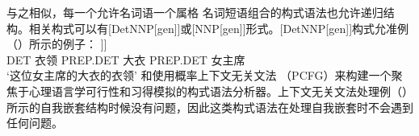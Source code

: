 与之相似，每一个允许名词语一个属格 名词短语组合的构式语法也允许递归结构。相关构式可以有[DetNNP[gen]]或[NNP[gen]]形式。[DetNNP[gen]]构式允准例（）所示的例子：
\ea
\gll [\sub{NP} des Kragens [\sub{NP} des Mantels [\sub{NP} der Vorsitzenden]]]\\
	{} DET 衣领 {} PREP.DET 大衣 {} PREP.DET 女主席\\
\glt `这位女主席的大衣的衣领'
\z
\citet{Jurafsky96a}和\citet*{BLT2009a}使用概率上下文无关文法 （PCFG）来构建一个聚焦于心理语言学可行性和习得模拟的构式语法分析器。上下文无关文法处理例（） 所示的自我嵌套结构时候没有问题，因此这类构式语法在处理自我嵌套时不会遇到任何问题。

